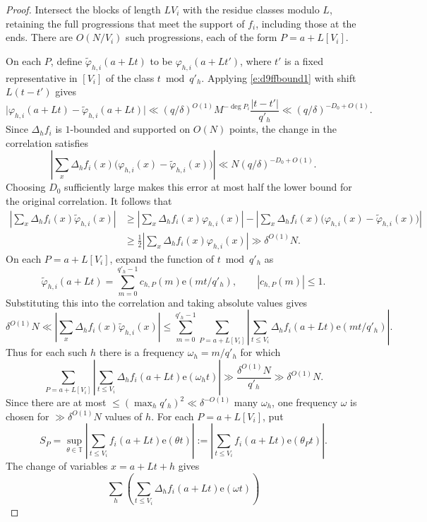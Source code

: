 \documentclass[12pt]{amsart}
\newcommand{\1}{\mathbf 1}
\newcommand{\e}{\mathrm e}
\theoremstyle{definition}
\begin{document}
\begin{proof}
Intersect the blocks of length \(LV_i\) with the residue classes
modulo \(L\), retaining the full progressions that meet the
support of \(f_i\), including those at the ends. There are
\(O(N/V_i)\) such progressions, each of the form \(P=a+L[V_i]\).

On each \(P\), define \(\widetilde\varphi_{h,i}(a+Lt)\) to be
\(\varphi_{h,i}(a+Lt')\), where \(t'\) is a fixed representative
in \([V_i]\) of the class \(t\bmod q'_h\). Applying \eqref{e:d9ffbound1} with shift \(L(t-t')\) gives
\[
 \bigl|\varphi_{h,i}(a+Lt)-\widetilde\varphi_{h,i}(a+Lt)\bigr|
 \ll (q/\delta)^{O(1)}M^{-\deg P_i}\frac{|t-t'|}{q'_h}
 \ll (q/\delta)^{-D_0+O(1)}.
\]
Since \(\Delta_h f_i\) is \(1\)-bounded and supported on \(O(N)\)
points, the change in the correlation satisfies
\[
 \left|\sum_x\Delta_h f_i(x)
       \bigl(\varphi_{h,i}(x)-\widetilde\varphi_{h,i}(x)\bigr)\right|
 \ll N(q/\delta)^{-D_0+O(1)}.
\]
Choosing \(D_0\) sufficiently large makes this error at most half
the lower bound for the original correlation. It follows that
\[
\begin{aligned}
 \left|\sum_x\Delta_h f_i(x)\widetilde\varphi_{h,i}(x)\right|
 &\ge
 \left|\sum_x\Delta_h f_i(x)\varphi_{h,i}(x)\right|
 -\left|\sum_x\Delta_h f_i(x)
   \bigl(\varphi_{h,i}(x)-\widetilde\varphi_{h,i}(x)\bigr)\right|\\
 &\ge \frac12
 \left|\sum_x\Delta_h f_i(x)\varphi_{h,i}(x)\right|
 \gg \delta^{O(1)}N.
\end{aligned}
\]
On each \(P=a+L[V_i]\), expand the function of \(t\bmod q'_h\) as
\[
 \widetilde\varphi_{h,i}(a+Lt)
 =\sum_{m=0}^{q'_h-1}c_{h,P}(m)\e(mt/q'_h),
 \qquad |c_{h,P}(m)|\le1.
\]
Substituting this into the correlation and taking absolute values
gives
\[
 \delta^{O(1)}N
 \ll \left|\sum_x\Delta_h f_i(x)\widetilde\varphi_{h,i}(x)\right|
 \le \sum_{m=0}^{q'_h-1}\sum_{P=a+L[V_i]}
    \left|\sum_{t\le V_i}\Delta_h f_i(a+Lt)\e(mt/q'_h)\right|.
\]
Thus for each such \(h\) there is a frequency
\(\omega_h=m/q'_h\) for which
\[
 \sum_{P=a+L[V_i]}
    \left|\sum_{t\le V_i}\Delta_h f_i(a+Lt)\e(\omega_h t)\right|
 \gg \frac{\delta^{O(1)}N}{q'_h}
 \gg \delta^{O(1)}N.
\]
Since there are at most \(\le(\max_h q'_h)^2\ll\delta^{-O(1)}\) many $\omega_h$,
one frequency \(\omega\) is chosen for
\(\gg\delta^{O(1)}N\) values of \(h\). For each \(P=a+L[V_i]\), put
\[
 S_P=\sup_{\theta\in\mathbb T}
 \left|\sum_{t\le V_i}f_i(a+Lt)\e(\theta t)\right|:= \left|\sum_{t\le V_i}f_i(a+Lt)\e(\theta_P t)\right|.
\]
The change of variables \(x=a+Lt+h\) gives
\[
 \sum_h\left(\sum_{t\le V_i}\Delta_h f_i(a+Lt)\e(\omega t)\right)
\]
\end{proof}
\end{document}
